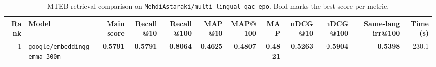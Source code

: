 \begin{table}[t]
\centering
\small
\begin{tabular}{r l r r r r r r r r r r}
\hline
Rank & Model & Main score & Recall@10 & Recall@100 & MAP@10 & MAP@100 & MAP & nDCG@10 & nDCG@100 & Same-lang irr@100 & Time (s) \\
\hline
1 & \texttt{google/embeddinggemma-300m} & \textbf{0.5791} & \textbf{0.5791} & \textbf{0.8064} & \textbf{0.4625} & \textbf{0.4807} & \textbf{0.4821} & \textbf{0.5263} & \textbf{0.5904} & \textbf{0.5398} & 230.1 \\
\hline
\end{tabular}
\caption{MTEB retrieval comparison on \texttt{MehdiAstaraki/multi-lingual-qac-epo}. Bold marks the best score per metric.}
\label{tab:mteb-model-comparison}
\end{table}
